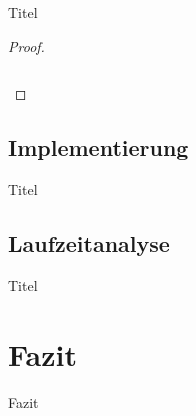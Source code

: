 \documentclass[t]{beamer}
\theoremstyle{plain}
\begin{document}
\begin{frame}{Titel}
\begin{proof}
{\begin{columns}
\begin{column}[t]{0.35\textwidth}
            \end{column}
        \end{columns}}
    \end{proof}
\end{frame}

\subsection{Implementierung}
\begin{frame}{Titel}
    
\end{frame}

\subsection{Laufzeitanalyse}
\begin{frame}{Titel}
    
\end{frame}


\section*{Fazit}
\begin{frame}{Fazit}
    
\end{frame}



    

\end{document}
